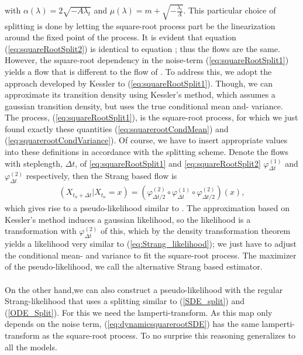 with $\alpha(\lambda) = 2\sqrt{-A\lambda_t}$ and $\mu(\lambda) = m + \sqrt{-\frac{\lambda_t}{A}}$.
This particular choice of splitting is done by letting the square-root process part be the linearization around the fixed point of the process. It is evident that equation (\ref{eq:squareRootSplit2}) is identical to equation \cite[(S10)]{DitlevsenSupplementary}; thus the flows are the same. However, the square-root dependency in the noise-term (\ref{eq:squareRootSplit1}) yields a flow that is different to the flow of \cite[(S9)]{DitlevsenSupplementary}. To address this, we adopt the approach developed by Kessler \cite{Kessler1997} to (\ref{eq:squareRootSplit1}). Though, we can approximate its transition density using Kessler's method, which assumes a gaussian transition density, but uses the true conditional mean and- variance. The process, (\ref{eq:squareRootSplit1}), is the square-root process, for which we just found exactly these quantities (\ref{eq:squarerootCondMean}) and (\ref{eq:squarerootCondVariance}). Of course, we have to insert appropriate values into these definitions in accordance with the splitting scheme. Denote the flows with steplength, $\Delta t$, of \ref{eq:squareRootSplit1} and \ref{eq:squareRootSplit2} $\varphi_{\Delta t}^{(1)}$ and $\varphi_{\Delta t}^{(2)}$ respectively, then the Strang based flow is 
\begin{align}
    \left(X_{t_n + \Delta t} | X_{t_n} = x\right) = \left(\varphi_{\Delta t/2}^{(2)} \circ \varphi_{\Delta t}^{(1)} \circ \varphi_{\Delta t/2}^{(2)}\right)(x),
\end{align} 
which gives rise to a pseudo-likelihood similar to \cite[(14)]{SplittingSchemes}. The approximation based on Kessler's method induces a gaussian likelihood, so the likelihood is a transformation with $\varphi_{\Delta t}^{(2)}$ of this, which by the density transformation theorem yields a likelihood very similar to (\ref{eq:Strang_likelihood}); we just have to adjust the conditional mean- and variance to fit the square-root process. The maximizer of the pseudo-likelihood, we call the alternative Strang based estimator.\\\\
On the other hand,we can also construct a pseudo-likelihood with the regular Strang-likelihood that uses a splitting similar to (\ref{SDE_split}) and (\ref{ODE_Split}). For this we need the lamperti-transform. As this map only depends on the noise term, (\ref{eq:dynamicsquarerootSDE}) has the same lamperti-transform as the square-root process. To no surprise this reasoning generalizes to all the models.\\\\
